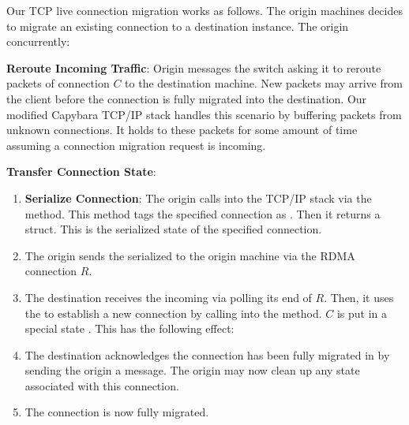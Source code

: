 Our TCP live connection migration works as follows. The origin machines decides to migrate an existing connection to a destination instance.
The origin concurrently:
\begin{compactitem}
    \item \textbf{Reroute Incoming Traffic}: Origin messages the switch asking it to reroute packets of connection $C$ to the destination machine. New packets may arrive from the client before the connection is fully migrated into the destination. Our modified Capybara TCP/IP stack handles this scenario by buffering packets from unknown connections. It holds to these packets for some amount of time assuming a connection migration request is incoming. 
    \item \textbf{Transfer Connection State}:
    \begin{enumerate}
        \item \textbf{Serialize Connection}: The origin calls into the TCP/IP stack via the  method. This method 
         tags the specified connection as . Then it returns a  struct. This is the serialized state of the specified connection.
        \item The origin sends the serialized  to the origin machine via the RDMA connection $R$.
        \item The destination receives the incoming  via polling its end of $R$. Then, it uses the  to establish a new connection by calling into the  method. $C$ is put in a special state . This has the following effect:
        \item The destination acknowledges the connection has been fully migrated in by sending the origin a message. The origin may now clean up any state associated with this connection. 
        \item The connection is now fully migrated.
    \end{enumerate}
\end{compactitem}

